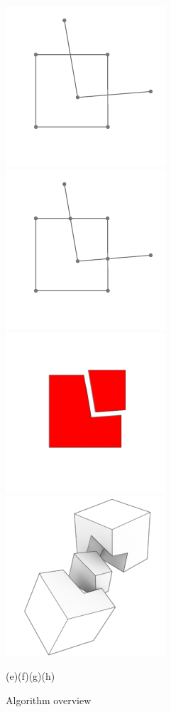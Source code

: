\begin{figure}[h]
    \begin{center}
        \includegraphics[width=.25\textwidth]{./img/ch1-5.pdf}%
        \includegraphics[width=.25\textwidth]{./img/ch1-6.pdf}%
        \includegraphics[width=.25\textwidth]{./img/ch1-7.pdf}%
        \includegraphics[width=.25\textwidth]{./img/ch1-8.pdf}%

        (e)\hspace{.22\textwidth}(f)\hspace{.22\textwidth}(g)\hspace{.22\textwidth}(h)
    \end{center}
    \caption{Algorithm overview}
    \label{img:spatial}
\end{figure}

